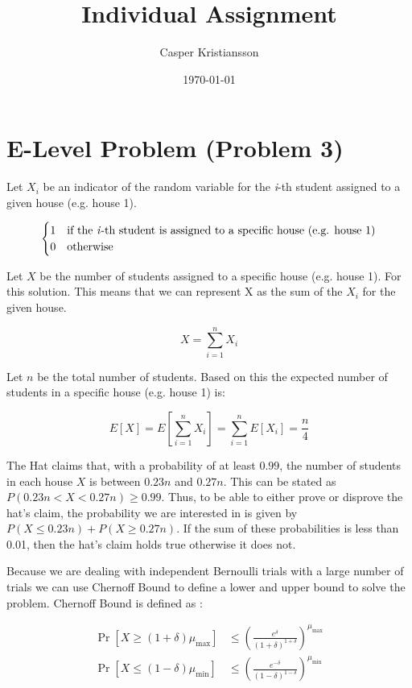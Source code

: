 \documentclass{article}
\title{Individual Assignment}
\author{Casper Kristiansson}
\date{\today}
\begin{document}
\maketitle

\section{E-Level Problem (Problem 3)}

\noindent Let \(X_{i}\) be an indicator of the random variable for the \textit{i}-th student assigned to a given house (e.g. house 1).

\begin{equation}
\begin{cases} 
1 & \text{if the \textit{i}-th student is assigned to a specific house (e.g. house 1)} \\
0 & \text{otherwise} 
\end{cases}
\end{equation}

\noindent Let \(X\) be the number of students assigned to a specific house (e.g. house 1). For this solution. This means that we can represent X as the sum of the \(X_{i}\) for the given house.

\[X = \sum_{i=1}^{n} X_i\]

\noindent Let \(n\) be the total number of students. Based on this the expected number of students in a specific house (e.g. house 1) is:

\[
E[X]=E[\sum_{i=1}^{n} X_i]=\sum_{i=1}^{n}E[X_i]=\frac{n}{4}
\]

\noindent The Hat claims that, with a probability of at least \(0.99\), the number of students in each house \(X\) is between \(0.23n\) and \(0.27n\). This can be stated as \(P(0.23n < X < 0.27n) \geq 0.99\). Thus, to be able to either prove or disprove the hat's claim, the probability we are interested in is given by \(P(X \leq 0.23n) + P(X \geq 0.27n)\). If the sum of these probabilities is less than 0.01, then the hat's claim holds true otherwise it does not.

\vspace{1em}

\noindent Because we are dealing with independent Bernoulli trials with a large number of trials we can use Chernoff Bound to define a lower and upper bound to solve the problem. Chernoff Bound is defined as \cite{harvey2014cpsc536n}:

\begin{align*}
\Pr \left[ X \geq (1 + \delta) \mu_{\text{max}} \right] &\leq \left(\frac{e^{\delta}}{(1+\delta)^{1+\delta}} \right)^{\mu_{\text{max}}} \\
\Pr \left[ X \leq (1 - \delta) \mu_{\text{min}} \right] &\leq \left(\frac{e^{-\delta}}{(1-\delta)^{1-\delta}} \right)^{\mu_{\text{min}}}
\end{align*}
\end{document}
